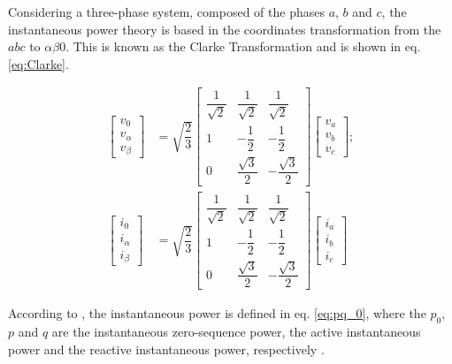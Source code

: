 Considering a three-phase system, composed of the phases $a$, $b$ and $c$, the instantaneous power theory is based in the coordinates transformation from the $abc$ to $\alpha \beta 0 $. This is known as the Clarke Transformation and is shown in eq. \ref{eq:Clarke}.


\begin{equation}
\begin{aligned}
\begin{bmatrix}
v_0\\
v_\alpha\\
v_\beta
\end{bmatrix}
& = \sqrt{\dfrac{2}{3}}
\begin{bmatrix}
\dfrac{1}{\sqrt{2}}	& \dfrac{1}{\sqrt{2}}	& \dfrac{1}{\sqrt{2}}		\\[2ex]
1					& -\dfrac{1}{2}			& -\dfrac{1}{2}				\\[2ex]
0					& \dfrac{\sqrt{3}}{2}	& -\dfrac{\sqrt{3}}{2}
\end{bmatrix}
\begin{bmatrix}
v_a\\
v_b\\
v_c
\end{bmatrix}
;\\
\begin{bmatrix}
i_0\\
i_\alpha\\
i_\beta
\end{bmatrix}
& = \sqrt{\dfrac{2}{3}}
\begin{bmatrix}
\dfrac{1}{\sqrt{2}}	& \dfrac{1}{\sqrt{2}}	& \dfrac{1}{\sqrt{2}}		\\[2ex]
1					& -\dfrac{1}{2}			& -\dfrac{1}{2}				\\[2ex]
0					& \dfrac{\sqrt{3}}{2}	& -\dfrac{\sqrt{3}}{2}
\end{bmatrix}
\begin{bmatrix}
i_a\\
i_b\\
i_c
\end{bmatrix}
\label{eq:Clarke}
\end{aligned}
\end{equation} 

According to \citep{Akagi2007}, the instantaneous power is defined in eq. \ref{eq:pq_0}, where the $p_0$, $p$ and $q$ are the instantaneous zero-sequence power, the active instantaneous power and the reactive instantaneous power, respectively \citep{Akagi2006,Peng1996}.

